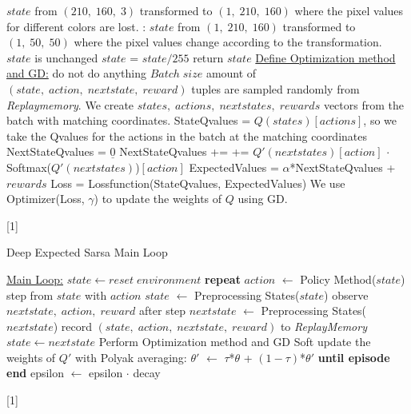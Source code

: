 \documentclass{article}
\begin{document}
\begin{algorithm}
\begin{algorithmic}[1]
        \State $state$ from $(210,\;160,\;3)$ transformed to $(1,\;210,\;160)$ where the pixel values for different colors are lost.
        :
            \State $state$ from $(1,\;210,\;160)$ transformed to $(1,\;50,\;50)$ where the pixel values change according to the transformation.
        \EndIf
    \Else
        \State $state$ is unchanged
    \EndIf
        \State $state$ = $state/255$
    \EndIf
    \State return $state$
    \newline
    \State \underline{Define Optimization method and GD:}
        \State do not do anything
    \EndIf
    \State $Batch\;size$ amount of $(state,\;action,\;nextstate,\;reward)$ tuples are sampled randomly from \textit{Replaymemory}.
    \State We create $states,\;actions,\;nextstates,\;rewards$ vectors from the batch with matching coordinates.
    \State StateQvalues = $Q(states)[actions]$, so we take the Q\;values for the actions in the batch at the matching coordinates
    \State NextStateQvalues = $\underline{0}$
        \State NextStateQvalues +=
        \State += $Q'(nextstates)[action]$ $\cdot$ Softmax($Q'(nextstates)$)$[action]$
    \EndFor
    \State ExpectedValues = $\alpha$*NextStateQvalues + $rewards$
    \State Loss = Loss\;function(StateQvalues, ExpectedValues)
    \State We use Optimizer(Loss, $\gamma$) to update the weights of $Q$ using GD.
    \end{algorithmic}[1]
\end{algorithm}
\newpage

\begin{algorithm}
    \begin{algorithmic}[2]
    \caption{Deep Expected Sarsa Main Loop}
    \State \underline{Main Loop:}
            \State $ state \gets reset\;environment$
            \State \textbf{repeat}
                \State $action$ $\gets$ Policy Method($state$)
                \State step from $state$ with $action$
                \State $state$ $\gets$ Preprocessing States($state$)
                \State observe $nextstate,\;action,\;reward$ after step
                \State $nextstate$ $\gets$ Preprocessing States($nextstate$)
                \State record $(state,\;action,\;nextstate,\;reward)$ to \textit{ReplayMemory}
                \State $state \gets nextstate$
                \State Perform Optimization method and GD
                \State Soft update the weights of $Q'$ with Polyak averaging:
                    \State $\theta'$ $\gets$ $\tau$*$\theta$ + $(1-\tau)$*$\theta'$
            \State \textbf{until episode end}
                \State epsilon $\gets$ epsilon $\cdot$ decay
            \EndIf
        \EndFor
    \end{algorithmic}[1]
\end{algorithm}
\end{document}
